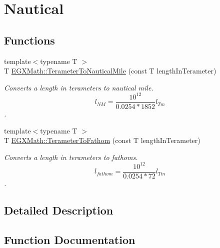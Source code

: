 \hypertarget{group___e_g_x_math-_conversions-_length_conversions-_terameter-_nautical}{}\section{Nautical}
\label{group___e_g_x_math-_conversions-_length_conversions-_terameter-_nautical}
\subsection*{Functions}
\begin{DoxyCompactItemize}
\item 
{\footnotesize template$<$typename T $>$ }\\T \mbox{\hyperlink{group___e_g_x_math-_conversions-_length_conversions-_terameter-_nautical_ga6a799ea329334a189c2ed5a898a238af}{E\+G\+X\+Math\+::\+Terameter\+To\+Nautical\+Mile}} (const T length\+In\+Terameter)
\begin{DoxyCompactList}\small\item\em Converts a length in terameters to nautical mile. \[ l_{NM}= \frac{10^{12}}{0.0254 * 1852} l_{Tm} \]. \end{DoxyCompactList}\item 
{\footnotesize template$<$typename T $>$ }\\T \mbox{\hyperlink{group___e_g_x_math-_conversions-_length_conversions-_terameter-_nautical_gaef70a960ef5e91001f3ff2bfeb0d96bf}{E\+G\+X\+Math\+::\+Terameter\+To\+Fathom}} (const T length\+In\+Terameter)
\begin{DoxyCompactList}\small\item\em Converts a length in terameters to fathoms. \[ l_{fathom}= \frac{10^{12}}{0.0254 * 72} l_{Tm} \]. \end{DoxyCompactList}\end{DoxyCompactItemize}


\subsection{Detailed Description}


\subsection{Function Documentation}
\mbox{\label{group___e_g_x_math-_conversions-_length_conversions-_terameter-_nautical_gaef70a960ef5e91001f3ff2bfeb0d96bf}} 
